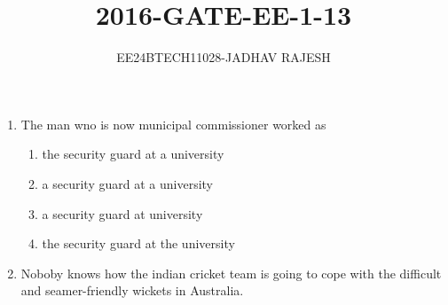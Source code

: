 \documentclass[journal,12pt,twocolumn]{IEEEtran}
\theoremstyle{remark}
\begin{document}

\vspace{3cm}

\title{2016-GATE-EE-1-13}
\author{EE24BTECH11028-JADHAV RAJESH}
\maketitle
\newpage
\bigskip
\begin{enumerate}
    \item The man wno is now municipal commissioner worked as\\
    \begin{enumerate}
        \item the security guard at a university\\
        \item a security guard at a university\\
         \item a security guard at  university\\
          \item the security guard at the university   
    \end{enumerate}
    \item  Noboby knows how the indian cricket team is going to cope with the difficult and seamer-friendly wickets in Australia.\\
    

\end{enumerate}
\end{document}
